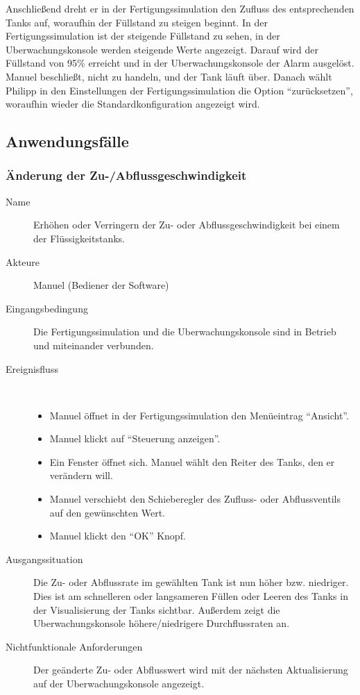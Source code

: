 \documentclass[parskip=full]{scrartcl}
\begin{document}
Anschlie{\ss}end dreht er in der \gls{Fertigungssimulation} den Zufluss des entsprechenden Tanks auf, woraufhin der F\"ullstand
zu steigen beginnt. In der \gls{Fertigungssimulation} ist der steigende F\"ullstand zu sehen, in der \gls{Uberwachungskonsole} werden
steigende Werte angezeigt.
Darauf wird der F\"ullstand von 95\% erreicht und in der \gls{Uberwachungskonsole} der Alarm ausgel\"ost. Manuel
beschlie{\ss}t, nicht zu handeln, und der Tank l\"auft \"uber. Danach w\"ahlt Philipp in den Einstellungen der
\gls{Fertigungssimulation} die Option "`zur\"ucksetzen"', woraufhin wieder die Standardkonfiguration angezeigt wird.

\subsection{Anwendungsfälle}
\subsubsection{Änderung der Zu-/Abflussgeschwindigkeit}
\begin{description}
  \item[Name] Erhöhen oder Verringern der Zu- oder Abflussgeschwindigkeit bei einem der Flüssigkeitstanks.
  \item[Akteure] Manuel (Bediener der Software)
  \item[Eingangsbedingung] Die \gls{Fertigungssimulation} und die \gls{Uberwachungskonsole} sind in Betrieb und miteinander verbunden.
  \item[Ereignisfluss]~\\
\begin{itemize}[noitemsep]
  \item Manuel öffnet in der \gls{Fertigungssimulation} den Menüeintrag "`Ansicht"'.
  \item Manuel klickt auf "`Steuerung anzeigen"'.
  \item Ein Fenster öffnet sich. Manuel wählt den Reiter des Tanks, den er verändern will.
  \item Manuel verschiebt den Schieberegler des Zufluss- oder Abflussventils auf den gewünschten Wert.
  \item Manuel klickt den "`OK"' Knopf.
\end{itemize}
  \item[Ausgangssituation] Die Zu- oder Abflussrate im gewählten Tank ist nun höher bzw. niedriger. Dies ist am schnelleren oder
    langsameren Füllen oder Leeren des Tanks in der Visualisierung der Tanks sichtbar.
    Außerdem zeigt die \gls{Uberwachungskonsole} höhere/niedrigere Durchflussraten an.
  \item [Nichtfunktionale Anforderungen] Der geänderte Zu- oder Abflusswert wird mit der nächsten Aktualisierung auf der \gls{Uberwachungskonsole} angezeigt.
\end{description}
\end{document}
